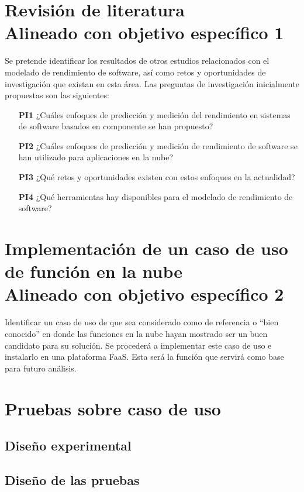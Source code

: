 ﻿\section[Revisión de literatura]{Revisión de literatura\\\small{Alineado con objetivo específico 1}}
Se pretende identificar los resultados de otros estudios relacionados con el modelado de rendimiento de software, así como retos y oportunidades de investigación que existan en esta área. Las preguntas de investigación inicialmente propuestas son las siguientes:
\begin{itemize}
    \item[\textbf{PI1}] ¿Cuáles enfoques de predicción y medición del rendimiento en sistemas de software basados en componente se han propuesto?
    \item[\textbf{PI2}] ¿Cuáles enfoques de predicción y medición de rendimiento de software se han utilizado para aplicaciones en la nube?
    \item[\textbf{PI3}] ¿Qué retos y oportunidades existen con estos enfoques en la actualidad?
    \item[\textbf{PI4}] ¿Qué herramientas hay disponibles para el modelado de rendimiento de software?
\end{itemize}

\section[Implementación de caso de uso de función en la nube]{Implementación de un caso de uso de función en la nube\\\small{Alineado con objetivo específico 2}}

Identificar un caso de uso de que sea considerado como de referencia o ``bien conocido'' en donde las funciones en la nube hayan mostrado ser un buen candidato para su solución. Se procederá a implementar este caso de uso e instalarlo en una plataforma FaaS. Esta será la función que servirá como base para futuro análisis.

\section{Pruebas sobre caso de uso}

\subsection{Diseño experimental}
\subsection{Diseño de las pruebas}
